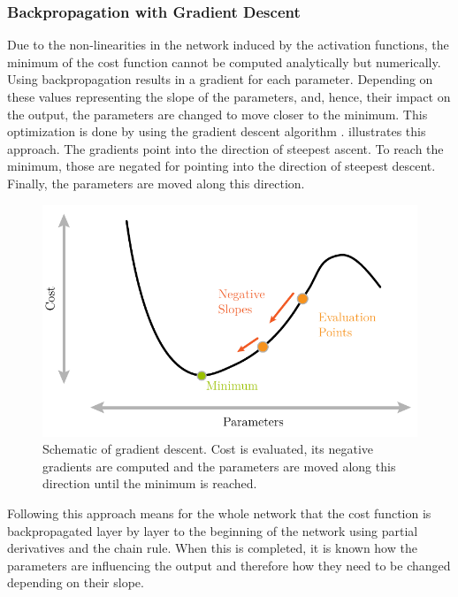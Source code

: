 \subsubsection{Backpropagation with Gradient Descent}
\label{sec:training-gradient-descent}
Due to the non-linearities in the network induced by the activation functions, the minimum of the cost function cannot be computed analytically but numerically.
Using backpropagation \cite{rumelhart1986learning, Goodfellow-et-al-2016} results in a gradient for each parameter.
Depending on these values representing the slope of the parameters, and, hence, their impact on the output, the parameters are changed to move closer to the minimum.
This optimization is done by using the gradient descent algorithm \cite{kiefer1952, robbins1951}.
 illustrates this approach.
The gradients point into the direction of steepest ascent.
To reach the minimum, those are negated for pointing into the direction of steepest descent.
Finally, the parameters are moved along this direction.
\begin{figure}
	\centering
	\includegraphics{images/gradient_descent.pdf}
	\caption[Schematic of gradient descent]{Schematic of gradient descent. Cost is evaluated, its negative gradients are computed and the parameters are moved along this direction until the minimum is reached.}
	\label{fig:gradient-descent}
\end{figure}
Following this approach means for the whole network that the cost function is backpropagated layer by layer to the beginning of the network using partial derivatives and the chain rule.
When this is completed, it is known how the parameters are influencing the output and therefore how they need to be changed depending on their slope.

